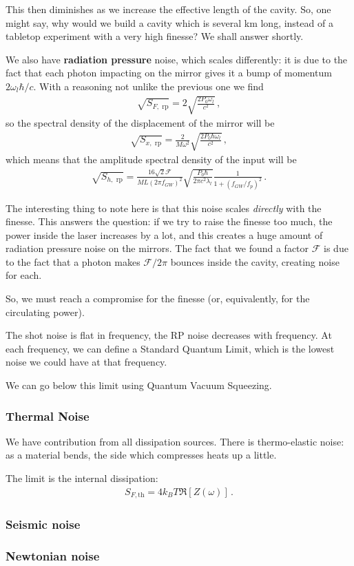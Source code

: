 \documentclass[main.tex]{subfiles}
\begin{document}
This then diminishes as we increase the effective length of the cavity. 
So, one might say, why would we build a cavity which is several km long, instead of a tabletop experiment with a very high finesse? We shall answer shortly.

We also have \textbf{radiation pressure} noise, which scales differently: it is due to the fact that each photon impacting on the mirror gives it a bump of momentum \(2 \omega_{l} \hbar / c\). 
With a reasoning not unlike the previous one we find 
%
\begin{align}
\sqrt{S_{F, \text{ rp}}} = 2 \sqrt{\frac{2 P_0 \omega_{l}}{c^2}}
\,,
\end{align}
%
so the spectral density of the displacement of the mirror will be 
%
\begin{align}
\sqrt{S_{x, \text{ rp}}} = \frac{2}{M \omega^2} \sqrt{\frac{2 P_0 \hbar \omega_{l}}{c^2}} 
\,,
\end{align}
%
which means that the amplitude spectral density of the input will be 
%
\begin{align}
\sqrt{S_{h, \text{ rp}}} = \frac{16 \sqrt{2} \mathcal{F}}{ML (2 \pi f_{GW})^2} \sqrt{\frac{P_0 \hbar}{2 \pi c^2 \lambda_{l}}} \frac{1}{1 + (f_{GW} / f_{p})^2}
\,.
\end{align}

The interesting thing to note here is that this noise scales \emph{directly} with the finesse. 
This answers the question: if we try to raise the finesse too much, the power inside the laser increases by a lot, and this creates a huge amount of radiation pressure noise on the mirrors. 
The fact that we found a factor \(\mathcal{F}\) is due to the fact that a photon makes \(\mathcal{F} / 2 \pi \) bounces inside the cavity, creating noise for each. 

So, we must reach a compromise for the finesse (or, equivalently, for the circulating power).

The shot noise is flat in frequency, the RP noise decreases with frequency. 
At each frequency, we can define a Standard Quantum Limit, which is the lowest noise we could have at that frequency. 

We can go below this limit using Quantum Vacuum Squeezing. 

\subsubsection{Thermal Noise}

We have contribution from all dissipation sources. 
There is thermo-elastic noise: as a material bends, the side which compresses heats up a little. 

The limit is the internal dissipation: 
%
\begin{align}
S_{F, \text{th}} = 4 k_B T \Re[Z(\omega )]  
\,.
\end{align}

\subsubsection{Seismic noise}

\subsubsection{Newtonian noise}
\end{document}
